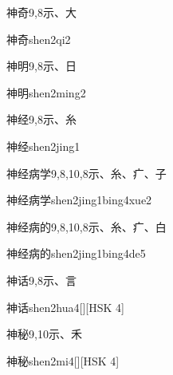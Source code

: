 \begin{entry}{神奇}{9,8}{⽰、⼤}
  \begin{phonetics}{神奇}{shen2qi2}
  \end{phonetics}
\end{entry}

\begin{entry}{神明}{9,8}{⽰、⽇}
  \begin{phonetics}{神明}{shen2ming2}
  \end{phonetics}
\end{entry}

\begin{entry}{神经}{9,8}{⽰、⽷}
  \begin{phonetics}{神经}{shen2jing1}
  \end{phonetics}
\end{entry}

\begin{entry}{神经病学}{9,8,10,8}{⽰、⽷、⽧、⼦}
  \begin{phonetics}{神经病学}{shen2jing1bing4xue2}
  \end{phonetics}
\end{entry}

\begin{entry}{神经病的}{9,8,10,8}{⽰、⽷、⽧、⽩}
  \begin{phonetics}{神经病的}{shen2jing1bing4de5}
  \end{phonetics}
\end{entry}

\begin{entry}{神话}{9,8}{⽰、⾔}
  \begin{phonetics}{神话}{shen2hua4}[][HSK 4]
  \end{phonetics}
\end{entry}

\begin{entry}{神秘}{9,10}{⽰、⽲}
  \begin{phonetics}{神秘}{shen2mi4}[][HSK 4]
  \end{phonetics}
\end{entry}


